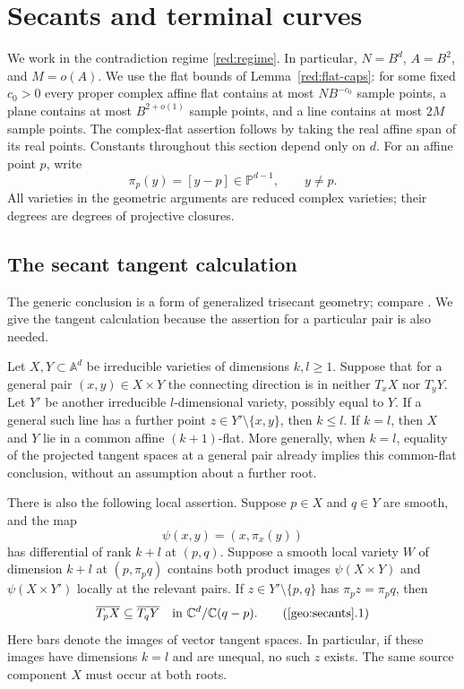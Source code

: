 \section{Secants and terminal curves}\label{geo:section}

We work in the contradiction regime \eqref{red:regime}.
In particular, $N=B^d$, $A=B^2$, and $M=o(A)$.
We use the flat bounds of Lemma~\ref{red:flat-caps}: for some fixed
$c_0>0$ every proper complex affine flat contains at most $NB^{-c_0}$
sample points, a plane contains at most $B^{2+o(1)}$ sample points,
and a line contains at most $2M$ sample points.
The complex-flat assertion follows by taking the real affine span of
its real points. Constants throughout this section depend only on $d$.
For an affine point $p$, write
\[
 \pi_p(y)=[y-p]\in\mathbb P^{d-1},\qquad y\ne p.
\]
All varieties in the geometric arguments are reduced complex varieties;
their degrees are degrees of projective closures.

\subsection{The secant tangent calculation}

The generic conclusion is a form of generalized trisecant geometry;
compare \cite[Section~3.2]{kaminskikanelbelovteicher2008}.  We give the
tangent calculation because the assertion for a particular pair is
also needed.

\begin{lemma}\label{geo:secants}
Let $X,Y\subset\mathbb A^d$ be irreducible varieties of dimensions
$k,l\ge1$. Suppose that for a general pair $(x,y)\in X\times Y$ the
connecting direction is in neither $T_xX$ nor $T_yY$.
Let $Y'$ be another irreducible $l$-dimensional variety, possibly equal
to $Y$. If a general such line has a further point
$z\in Y'\setminus\{x,y\}$, then $k\le l$.
If $k=l$, then $X$ and $Y$ lie in a common affine $(k+1)$-flat.
More generally, when $k=l$, equality of the projected tangent spaces
at a general pair already implies this common-flat conclusion,
without an assumption about a further root.

There is also the following local assertion. Suppose $p\in X$ and
$q\in Y$ are smooth, and the map
\[
 \psi(x,y)=(x,\pi_x(y))
\]
has differential of rank $k+l$ at $(p,q)$.
Suppose a smooth local variety $W$ of dimension $k+l$ at
$(p,\pi_pq)$ contains both product images
$\psi(X\times Y)$ and $\psi(X\times Y')$ locally at the relevant
pairs. If $z\in Y'\setminus\{p,q\}$ has $\pi_pz=\pi_pq$, then
\[
 \overline{T_pX}\subseteq\overline{T_qY}
 \quad\hbox{in }\mathbb C^d/\mathbb C(q-p).
 \tag{\ref*{geo:secants}.1}\label{geo:tangent-inclusion}
\]
Here bars denote the images of vector tangent spaces. In particular,
if these images have dimensions $k=l$ and are unequal, no such $z$
exists. The same source component $X$ must occur at both roots.
\end{lemma}


